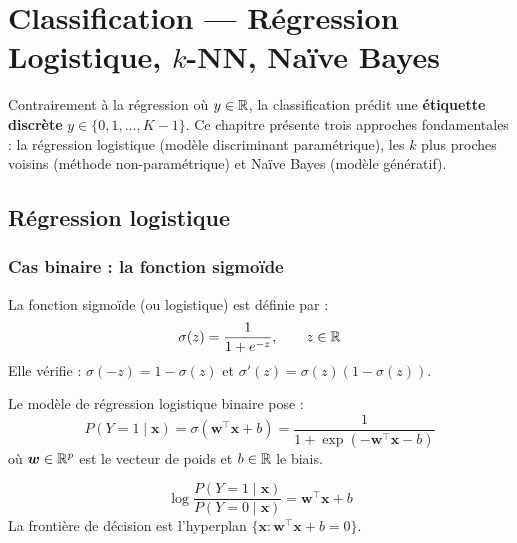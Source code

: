 \chapter{Classification --- R\'egression Logistique, $k$-NN, Na\"ive Bayes}
\label{ch:classification}

\begin{intuition}[title=\textbf{Du continu au discret}]
Contrairement \`a la r\'egression o\`u $y \in \mathbb{R}$, la classification pr\'edit une
\textbf{\'etiquette discr\`ete} $y \in \{0, 1, \ldots, K-1\}$. Ce chapitre pr\'esente
trois approches fondamentales : la r\'egression logistique (mod\`ele discriminant
param\'etrique), les $k$ plus proches voisins (m\'ethode non-param\'etrique) et
Na\"ive Bayes (mod\`ele g\'en\'eratif).
\end{intuition}

\section{R\'egression logistique}
\label{sec:logistic}

\subsection{Cas binaire : la fonction sigmo\"ide}

\begin{definition}
La fonction sigmo\"ide (ou logistique) est d\'efinie par :
\[
  \sigma(z) = \frac{1}{1 + e^{-z}}, \qquad z \in \mathbb{R}
\]
Elle v\'erifie : $\sigma(-z) = 1 - \sigma(z)$ et $\sigma'(z) = \sigma(z)(1 - \sigma(z))$.
\end{definition}

Le mod\`ele de r\'egression logistique binaire pose :
\[
  P(Y = 1 \mid \bm{x}) = \sigma(\bm{w}^\top \bm{x} + b)
  = \frac{1}{1 + \exp(-\bm{w}^\top \bm{x} - b)}
\]
o\`u $\bm{w} \in \mathbb{R}^p$ est le vecteur de poids et $b \in \mathbb{R}$ le biais.

\begin{formules}[title=\textbf{Log-odds (logit)}]
\[
  \log \frac{P(Y=1 \mid \bm{x})}{P(Y=0 \mid \bm{x})}
  = \bm{w}^\top \bm{x} + b
\]
La fronti\`ere de d\'ecision est l'hyperplan $\{\bm{x} : \bm{w}^\top \bm{x} + b = 0\}$.
\end{formules}

